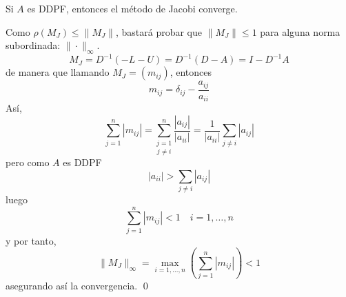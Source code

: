 \begin{prop}
    Si $A$ es DDPF, entonces el método de Jacobi converge.
\end{prop}
\begin{dem}
    Como $\rho(M_J)\leq \|M_J\|$, bastará probar que $\|M_J\|\leq 1 $ para alguna norma subordinada: $\|\cdot\|_{\infty}$.
    $$M_J=D^{-1}(-L-U)=D^{-1}(D-A)=I-D^{-1}A$$
    de manera que llamando $M_J=(m_{ij})$, entonces
    $$m_{ij}=\delta_{ij}-\dfrac{a_{ij}}{a_{ii}}$$
    Así, 
    $$\sum_{j =1}^n |m_{ij}|=\underset{j\neq i}{\sum_{j=1}^n} \dfrac{|a_{ij}|}{|a_{ii}|}=\dfrac{1}{{|a_{ii}|}} \sum_{j\neq i} {|a_{ij}|}$$
    pero como $A$ es DDPF
    $$|a_{ii}| >  \sum_{j\neq i} {|a_{ij}|}$$
    luego 
    $$\sum_{j =1}^n |m_{ij}| < 1 \quad i=1,\ldots,n$$
    y por tanto,
    $$\|M_J\|_{\infty}=\max_{i=1,\ldots,n}\left(\sum_{j =1}^n |m_{ij}|\right)<1$$
    asegurando así la convergencia.
    \qed\end{dem} 
